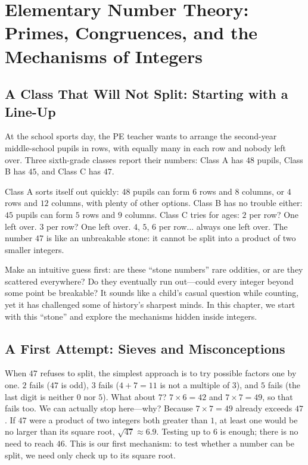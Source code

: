 \chapter{Elementary Number Theory: Primes, Congruences, and the Mechanisms of Integers}

\section{A Class That Will Not Split: Starting with a Line-Up}

At the school sports day, the PE teacher wants to arrange the second-year middle-school pupils in rows, with equally many in each row and nobody left over. Three sixth-grade classes report their numbers: Class A has $48$ pupils, Class B has $45$, and Class C has $47$.

Class A sorts itself out quickly: $48$ pupils can form $6$ rows and $8$ columns, or $4$ rows and $12$ columns, with plenty of other options. Class B has no trouble either: $45$ pupils can form $5$ rows and $9$ columns. Class C tries for ages: $2$ per row? One left over. $3$ per row? One left over. $4$, $5$, $6$ per row... always one left over. The number $47$ is like an unbreakable stone: it cannot be split into a product of two smaller integers.

Make an intuitive guess first: are these ``stone numbers'' rare oddities, or are they scattered everywhere? Do they eventually run out---could every integer beyond some point be breakable? It sounds like a child's casual question while counting, yet it has challenged some of history's sharpest minds. In this chapter, we start with this ``stone'' and explore the mechanisms hidden inside integers.

\section{A First Attempt: Sieves and Misconceptions}

When $47$ refuses to split, the simplest approach is to try possible factors one by one. $2$ fails ($47$ is odd), $3$ fails ($4+7=11$ is not a multiple of $3$), and $5$ fails (the last digit is neither $0$ nor $5$). What about $7$? $7\times 6=42$ and $7\times 7=49$, so that fails too. We can actually stop here---why? Because $7\times 7=49$ already exceeds $47$. If $47$ were a product of two integers both greater than $1$, at least one would be no larger than its square root, $\sqrt{47}\approx 6.9$. Testing up to $6$ is enough; there is no need to reach $46$. This is our first mechanism: to test whether a number can be split, we need only check up to its square root.

